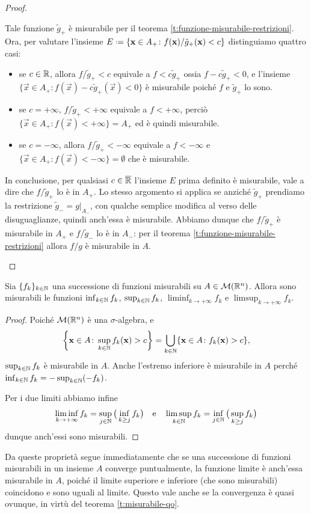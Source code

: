 \begin{proof}
\begin{itemize}
			Tale funzione $\tilde g_+$ è misurabile per il teorema \ref{t:funzione-misurabile-restrizioni}.
			Ora, per valutare l'insieme $E\defeq\{\vec x\in A_+\colon f(\vec x)/{\tilde g_+(\vec x)}<c\}$ distinguiamo quattro casi:
			\begin{itemize}
				\item se $c\in\mathbb{R}$, allora $f/{\tilde g_+}<c$ equivale a $f<c\tilde g_+$ ossia $f-c\tilde g_+<0$, e l'insieme $\{\vec x\in A_+\colon f(\vec x)-c\tilde g_+(\vec x)<0\}$ è misurabile poich\'e $f$ e $\tilde g_+$ lo sono.
				\item se $c=+\infty$, $f/{\tilde g_+}<+\infty$ equivale a $f<+\infty$, perciò $\{\vec x\in A_+\colon f(\vec x)<+\infty\}=A_+$ ed è quindi misurabile.
				\item se $c=-\infty$, allora $f/{\tilde g_+}<-\infty$ equivale a $f<-\infty$ e $\{\vec x\in A_+\colon f(\vec x)<-\infty\}=\emptyset$ che è misurabile.
			\end{itemize}
			In conclusione, per qualsiasi $c\in\overline{\mathbb{R}}$ l'insieme $E$ prima definito è misurabile, vale a dire che $f/{\tilde g_+}$ lo è in $A_+$.
			Lo stesso argomento si applica se anzich\'e $\tilde g_+$ prendiamo la restrizione $\tilde g_-=g|_{A_-}$, con qualche semplice modifica al verso delle disuguaglianze, quindi anch'essa è misurabile.
			Abbiamo dunque che $f/{\tilde g_+}$ è misurabile in $A_+$ e $f/{\tilde g_-}$ lo è in $A_-$: per il teorema \ref{t:funzione-misurabile-restrizioni} allora $f/g$ è misurabile in $A$.\qedhere
	\end{itemize}
\end{proof}
\begin{proprieta} \label{pr:estremi-successioni-funzioni-misurabili}
	Sia $\{f_k\}_{k\in\mathbb{N}}$ una successione di funzioni misurabili su $A\in\mathcal M(\mathbb{R}^n)$.
	Allora sono misurabili le funzioni $\inf_{k\in\mathbb{N}}f_k$, $\sup_{k\in\mathbb{N}}f_k$, $\liminf_{k\to+\infty}f_k$ e $\limsup_{k\to+\infty}f_k$.
\end{proprieta}
\begin{proof}
	Poich\'e $\mathcal M(\mathbb{R}^n)$ è una $\sigma$-algebra, e
	\begin{equation}
		\bigg\{\mathbf{x}\in A\colon \sup_{k\in\mathbb{N}}f_k(\mathbf{x})>c\bigg\}=\bigcup_{k\in\mathbb{N}}\{\mathbf{x}\in A\colon f_k(\mathbf{x})>c\},
	\end{equation}
	$\sup_{k\in\mathbb{N}}f_k$ è misurabile in $A$.
	Anche l'estremo inferiore è misurabile in $A$ perch\'e $\inf_{k\in\mathbb{N}}f_k=-\sup_{k\in\mathbb{N}}(-f_k)$.

	Per i due limiti abbiamo infine
	\begin{equation}
		\liminf_{k\to+\infty}f_k=\sup_{j\in\mathbb{N}}\big(\inf_{k\geq j}f_k\big)\quad\text{e}\quad\limsup_{k\in\mathbb{N}}f_k=\inf_{j\in\mathbb{N}}\big(\sup_{k\geq j}f_k\big)
	\end{equation}
	dunque anch'essi sono misurabili.
\end{proof}
Da queste proprietà segue immediatamente che se una successione di funzioni misurabili in un insieme $A$ converge puntualmente, la funzione limite è anch'essa misurabile in $A$, poich\'e il limite superiore e inferiore (che sono misurabili) coincidono e sono uguali al limite.
Questo vale anche se la convergenza è quasi ovunque, in virtù del teorema \ref{t:misurabile-qo}.


